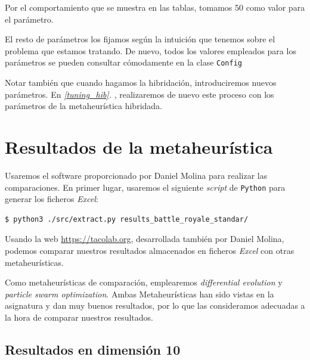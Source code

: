 \documentclass[11pt]{article}
\begin{document}
Por el comportamiento que se muestra en las tablas, tomamos 50 como valor para el parámetro.

El resto de parámetros los fijamos según la intuición que tenemos sobre el problema que estamos tratando. De nuevo, todos los valores empleados para los parámetros se pueden consultar cómodamente en la clase \lstinline{Config}

Notar también que cuando hagamos la hibridación, introduciremos nuevos parámetros. En \emph{\ref{tuning_hib}. }, realizaremos de nuevo este proceso con los parámetros de la metaheurística hibridada.

\pagebreak
\section{Resultados de la metaheurística} \label{resultados}

Usaremos el software proporcionado por Daniel Molina \cite{daniel_repo:online} para realizar las comparaciones. En primer lugar, usaremos el siguiente \emph{script} de \lstinline{Python} para generar los ficheros \emph{Excel}:

\begin{lstlisting}[language=Bash]
$ python3 ./src/extract.py results_battle_royale_standar/
\end{lstlisting}

Usando la web \url{https://tacolab.org}, desarrollada también por Daniel Molina, podemos comparar nuestros resultados almacenados en ficheros \emph{Excel} con otras metaheurísticas.

Como metaheurísticas de comparación, emplearemos \emph{differential evolution} y \emph{particle swarm optimization}. Ambas Metaheurísticas han sido vistas en la asignatura y dan muy buenos resultados, por lo que las consideramos adecuadas a la hora de comparar nuestros resultados.


\subsection{Resultados en dimensión 10}
\end{document}
